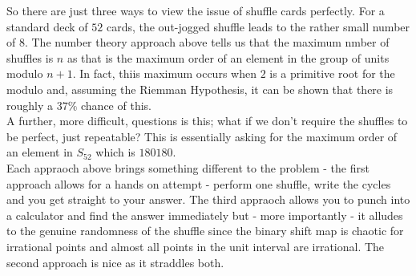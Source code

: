\documentclass[../../Axiomathic.tex]{subfiles}
\begin{document}
So there are just three ways to view the issue of shuffle cards perfectly. For a standard deck of $52$ cards, the out-jogged shuffle leads to the rather small number of 8. The number theory approach above tells us that the maximum nmber of shuffles is $n$ as that is the maximum order of an element in the group of units modulo $n+1$. In fact, thiis maximum occurs when $2$ is a primitive root for the modulo and, assuming the Riemman Hypothesis, it can be shown that there is roughly a $37\%$ chance of this.
\\
A further, more difficult, questions is this; what if we don't require the shuffles to be perfect, just repeatable? This is essentially asking for the maximum order of an element in $S_{52}$ which is $180180$. \\

Each appraoch above brings something different to the problem - the first approach allows for a hands on attempt - perform one shuffle, write the cycles and you get straight to your answer. The third appraoch allows you to punch into a calculator and find the answer immediately but - more importantly - it alludes to the genuine randomness of the shuffle since the binary shift map is chaotic for irrational points and almost all points in the unit interval are irrational. The second approach is nice as it straddles both. 
			

  
\end{document}
